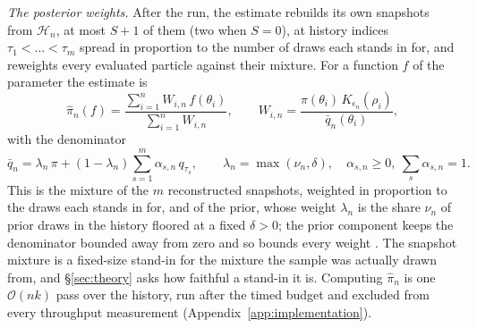 \documentclass[10pt]{article}
\theoremstyle{plain}
\theoremstyle{definition}
\begin{document}
\emph{The posterior weights.} After the run, the estimate rebuilds its own snapshots from $\mathcal{H}_n$, at most $S{+}1$ of them (two when $S=0$), at history indices $\tau_1<\dots<\tau_m$ spread in proportion to the number of draws each stands in for, and reweights every evaluated particle against their mixture. For a function $f$ of the parameter the estimate is
\begin{equation}
\widehat\pi_n(f) = \frac{\sum_{i=1}^n W_{i,n}\,f(\theta_i)}{\sum_{i=1}^n W_{i,n}},
\qquad
W_{i,n} = \frac{\pi(\theta_i)\,K_{\epsilon_n}(\rho_i)}{\bar q_n(\theta_i)},
\label{eq:posterior-estimator}
\end{equation}
with the denominator
\begin{equation}
\bar q_n = \lambda_n\,\pi + (1-\lambda_n)\sum_{s=1}^{m}\alpha_{s,n}\,q_{\tau_s},
\qquad \lambda_n=\max(\nu_n,\delta),\quad \alpha_{s,n}\ge0,\ \textstyle\sum_s\alpha_{s,n}=1.
\label{eq:snapshot-denominator}
\end{equation}
This is the mixture of the $m$ reconstructed snapshots, weighted in proportion to the draws each stands in for, and of the prior, whose weight $\lambda_n$ is the share $\nu_n$ of prior draws in the history floored at a fixed $\delta>0$; the prior component keeps the denominator bounded away from zero and so bounds every weight \citep{owen2000safe}. The snapshot mixture is a fixed-size stand-in for the mixture the sample was actually drawn from, and \S\ref{sec:theory} asks how faithful a stand-in it is. Computing $\widehat\pi_n$ is one $\mathcal{O}(nk)$ pass over the history, run after the timed budget and excluded from every throughput measurement (Appendix~\ref{app:implementation}).
\end{document}
